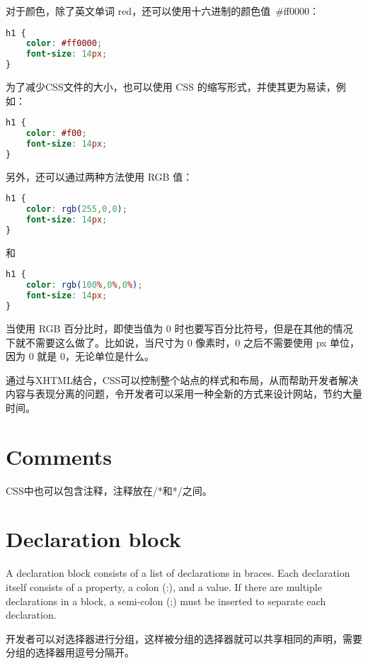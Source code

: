 对于颜色，除了英文单词 red，还可以使用十六进制的颜色值~\#ff0000：

\begin{lstlisting}[language=CSS]
h1 {
    color: #ff0000; 
    font-size: 14px;
}
\end{lstlisting}

为了减少CSS文件的大小，也可以使用 CSS 的缩写形式，并使其更为易读，例如：

\begin{lstlisting}[language=CSS]
h1 {
    color: #f00; 
    font-size: 14px;
}
\end{lstlisting}

另外，还可以通过两种方法使用 RGB 值：

\begin{lstlisting}[language=CSS]
h1 {
    color: rgb(255,0,0); 
    font-size: 14px;
}
\end{lstlisting}

和

\begin{lstlisting}[language=CSS]
h1 {
    color: rgb(100%,0%,0%); 
    font-size: 14px;
}
\end{lstlisting}

当使用 RGB 百分比时，即使当值为 0 时也要写百分比符号，但是在其他的情况下就不需要这么做了。比如说，当尺寸为 0 像素时，0 之后不需要使用 px 单位，因为 0 就是 0，无论单位是什么。

通过与XHTML结合，CSS可以控制整个站点的样式和布局，从而帮助开发者解决内容与表现分离的问题，令开发者可以采用一种全新的方式来设计网站，节约大量时间。

\section{Comments}

CSS中也可以包含注释，注释放在/*和*/之间。




\section{Declaration block}

A declaration block consists of a list of declarations in braces. Each declaration itself consists of a property, a colon (:), and a value. If there are multiple declarations in a block, a semi-colon (;) must be inserted to separate each declaration.


开发者可以对选择器进行分组，这样被分组的选择器就可以共享相同的声明，需要分组的选择器用逗号分隔开。

